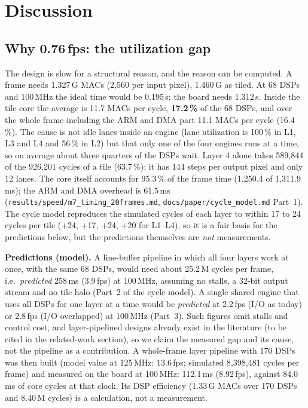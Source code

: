 \documentclass[conference]{IEEEtran}
\begin{document}
\section{Discussion}\label{sec:discussion}

\subsection{Why 0.76\,fps: the utilization gap}
The design is slow for a structural reason, and the reason can be computed. A frame needs 1.327\,G MACs (2{,}560 per input pixel), 1.460\,G as tiled. At 68 DSPs and 100\,MHz the ideal time would be 0.195\,s; the board needs 1.312\,s.
Inside the tile core the average is 11.7 MACs per cycle, \textbf{17.2\,\%} of the 68 DSPs, and over the whole frame including the ARM and DMA part 11.1 MACs per cycle (16.4\,\%).
The cause is not idle lanes inside an engine (lane utilization is 100\,\% in L1, L3 and L4 and 56\,\% in L2) but that only one of the four engines runs at a time, so on average about three quarters of the DSPs wait.
Layer 4 alone takes 589{,}844 of the 926{,}201 cycles of a tile (63.7\,\%): it has 144 steps per output pixel and only 12 lanes.
The core itself accounts for 95.3\,\% of the frame time (1{,}250.4 of 1{,}311.9\,ms); the ARM and DMA overhead is 61.5\,ms (\texttt{results/\allowbreak{}speed/\allowbreak{}m7\_timing\_20frames.md}, \texttt{docs/\allowbreak{}paper/\allowbreak{}cycle\_model.md} Part~1).
The cycle model reproduces the simulated cycles of each layer to within 17 to 24 cycles per tile (+24, +17, +24, +20 for L1--L4), so it is a fair basis for the predictions below, but the predictions themselves are \emph{not} measurements.

\textbf{Predictions (model).} A line-buffer pipeline in which all four layers work at once, with the same 68 DSPs, would need about 25.2\,M cycles per frame, i.e.\ \emph{predicted} 258\,ms (3.9\,fps) at 100\,MHz, assuming no stalls, a 32-bit output stream and no tile halo (Part~2 of the cycle model).
A single shared engine that uses all DSPs for one layer at a time would be \emph{predicted} at 2.2\,fps (I/O as today) or 2.8\,fps (I/O overlapped) at 100\,MHz (Part~3). Such figures omit stalls and control cost, and layer-pipelined designs already exist in the literature (to be cited in the related-work section), so we claim the measured gap and its cause, not the pipeline as a contribution.
A whole-frame layer pipeline with 170 DSPs was then built (model value at 125\,MHz: 13.6\,fps; simulated 8{,}398{,}481 cycles per frame) and measured on the board at 100\,MHz: 112.1\,ms (8.92\,fps), against 84.0\,ms of core cycles at that clock. Its DSP efficiency (1.33\,G MACs over 170 DSPs and 8.40\,M cycles) is a calculation, not a measurement.
\end{document}
